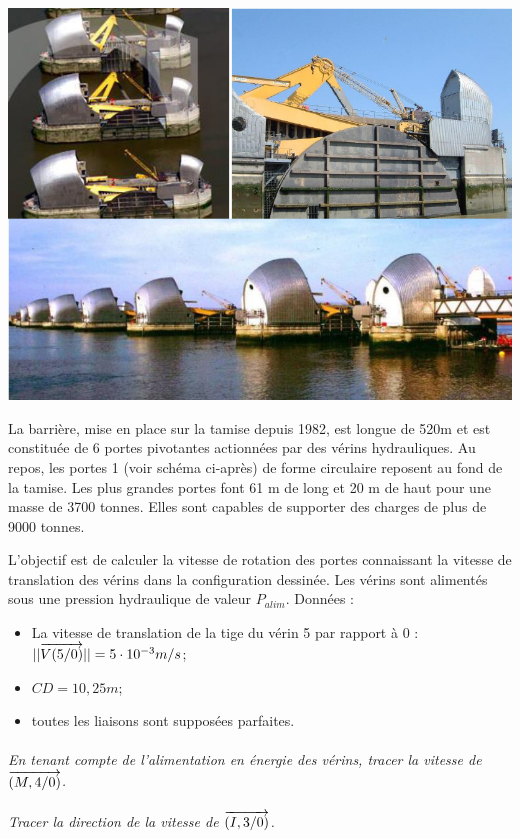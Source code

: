 \documentclass[11pt,oneside]{article}
\begin{document}
\begin{center}
\includegraphics[width=.8\textwidth]{png/img1}
\end{center}

La barrière, mise en place sur la tamise depuis 1982, est longue de 520m et est constituée de
6 portes pivotantes actionnées par des vérins hydrauliques. Au repos, les portes 1 (voir schéma ci-après)
de forme circulaire reposent au fond de la tamise. Les plus grandes portes font 61 m de long
et 20 m de haut pour une masse de 3700 tonnes. Elles sont capables de supporter des charges de
plus de 9000 tonnes.

L'objectif est de calculer la vitesse de rotation des portes connaissant la vitesse de translation des
vérins dans la configuration dessinée. Les vérins sont alimentés sous une pression hydraulique de
valeur $P_{alim}$.
Données :
\begin{itemize}
\item La vitesse de translation de la tige du vérin 5 par rapport à 0 : $||\overrightarrow{V(5/0)}||=5\cdot10^{-3} m/s$;
\item $CD=10,25m$;
\item toutes les liaisons sont supposées parfaites.
\end{itemize}

\paragraph{}
\textit{En tenant compte de l'alimentation en énergie des vérins, tracer la vitesse de $\overrightarrow{(M,4/ 0)}$.}

\paragraph{}
\textit{Tracer la direction de la vitesse de $\overrightarrow{(I,3/ 0)}$.}
\end{document}
